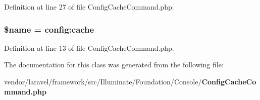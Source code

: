 Definition at line 27 of file Config\+Cache\+Command.\+php.

\subsubsection[{\$name}]{\setlength{\rightskip}{0pt plus 5cm}\${\bf name} = \textquotesingle{}config\+:cache\textquotesingle{}\hspace{0.3cm}{\ttfamily [protected]}}\label{class_illuminate_1_1_foundation_1_1_console_1_1_config_cache_command_ab2fc40d43824ea3e1ce5d86dee0d763b}


Definition at line 13 of file Config\+Cache\+Command.\+php.



The documentation for this class was generated from the following file\+:\begin{DoxyCompactItemize}
\item 
vendor/laravel/framework/src/\+Illuminate/\+Foundation/\+Console/{\bf Config\+Cache\+Command.\+php}\end{DoxyCompactItemize}

